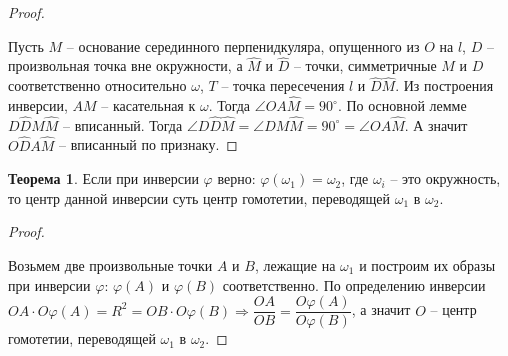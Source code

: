 \documentclass[12pt]{article}
\theoremstyle{definition}
\newtheorem{theorem}{Теорема}[section]
\begin{document}
\begin{proof}
\begin{center}
        \end{center}
        Пусть $M$ -- основание серединного перпенидкуляра, опущенного из $O$ на $l$, $D$ -- произвольная точка вне окружности, а $\widehat{M}$ и $\widehat{D}$ -- точки, симметричные $M$ и $D$ соответственно относительно $\omega$, $T$ -- точка пересечения $l$ и $\widehat{D}\widehat{M}$. Из построения инверсии, $AM$ -- касательная к $\omega$. Тогда $\angle OA\widehat{M}=90^{\circ}$. По основной лемме $D\widehat{D}M\widehat{M}$ -- вписанный. Тогда $\angle D\widehat{D}\widehat{M}=\angle DM\widehat{M}=90^{\circ}=\angle OA\widehat{M}$. А значит $O\widehat{D}A\widehat{M}$ -- вписанный по признаку.
    \end{proof}
    \begin{theorem}
        Если при инверсии $\varphi$ верно: $\varphi(\omega_1)=\omega_2$, где $\omega_i$ -- это  окружность, то центр данной инверсии суть центр гомотетии, переводящей $\omega_1$ в $\omega_2$.
    \end{theorem}
    \begin{proof}
        $ $\par\nobreak\ignorespaces
        \begin{center}
        \end{center}
        Возьмем две произвольные точки $A$ и $B$, лежащие на $\omega_1$ и построим их образы при инверсии $\varphi$: $\varphi(A)$ и $\varphi(B)$ соответственно. По определению инверсии $OA\cdot O\varphi(A)=R^2=OB\cdot O\varphi(B)\Longrightarrow \dfrac{OA}{OB}=\dfrac{O\varphi(A)}{O\varphi(B)}$, а значит $O$ -- центр гомотетии, переводящей $\omega_1$ в $\omega_2$.
    \end{proof}
\end{document}
